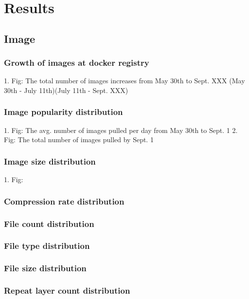 
\section{Results}

\subsection{Image}

\subsubsection{Growth  of images at docker registry}

1. Fig: The total number of images increases from May 30th to Sept. XXX (May 30th - July 11th)(July 11th - Sept. XXX)

\subsubsection{Image popularity distribution}

1. Fig: The avg. number of images pulled per day from May 30th to Sept. 1
2. Fig: The total number of images pulled by Sept. 1

\subsubsection{Image size distribution}

1. Fig: 

\subsubsection{Compression rate distribution}

\subsubsection{File count distribution}

\subsubsection{File type distribution}

\subsubsection{File size distribution}

\subsubsection{Repeat layer count distribution}

